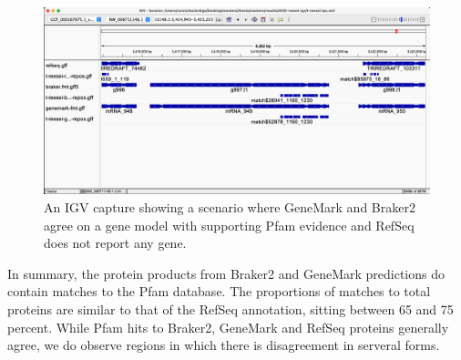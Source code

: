 \begin{figure}
  \centering
  \includegraphics[width=\textwidth]{figures/igv/ips-braker-genemark-norefseq.png}
  \caption[RefSeq absence with IPS evidence]{An IGV capture showing a
    scenario where GeneMark and Braker2 agree on a gene model with
    supporting Pfam evidence and RefSeq does not report any gene.}
  \label{fig:ips-no-refseq}
\end{figure}

In summary, the protein products from Braker2 and GeneMark predictions
do contain matches to the Pfam database. The proportions of matches to
total proteins are similar to that of the RefSeq annotation, sitting
between 65 and 75 percent. While Pfam hits to Braker2, GeneMark and
RefSeq proteins generally agree, we do observe regions in which there
is disagreement in serveral forms.
